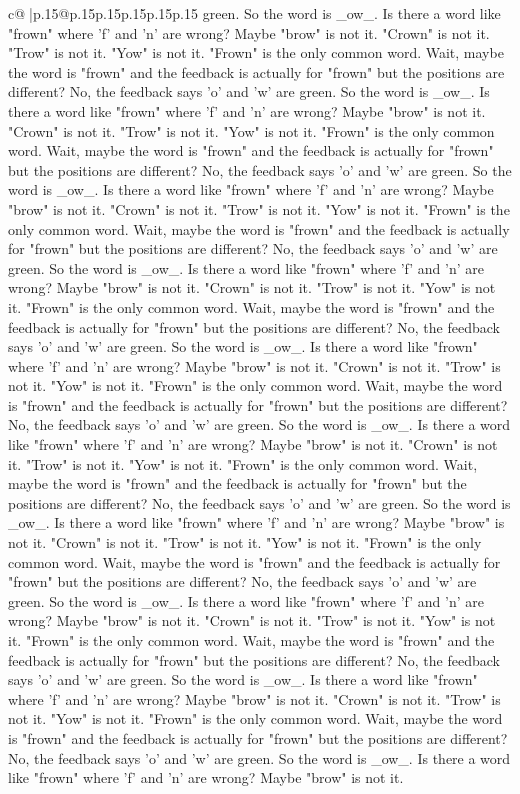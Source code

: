 \documentclass{article}
\begin{document}
{\begin{supertabular}{c@{$\;$}|p{.15\linewidth}@{}p{.15\linewidth}p{.15\linewidth}p{.15\linewidth}p{.15\linewidth}p{.15\linewidth}}
{{{green. So the word is \_ow\_. Is there a word like "frown" where 'f' and 'n' are wrong? Maybe "brow" is not it. "Crown" is not it. "Trow" is not it. "Yow" is not it. "Frown" is the only common word. Wait, maybe the word is "frown" and the feedback is actually for "frown" but the positions are different? No, the feedback says 'o' and 'w' are green. So the word is \_ow\_. Is there a word like "frown" where 'f' and 'n' are wrong? Maybe "brow" is not it. "Crown" is not it. "Trow" is not it. "Yow" is not it. "Frown" is the only common word. Wait, maybe the word is "frown" and the feedback is actually for "frown" but the positions are different? No, the feedback says 'o' and 'w' are green. So the word is \_ow\_. Is there a word like "frown" where 'f' and 'n' are wrong? Maybe "brow" is not it. "Crown" is not it. "Trow" is not it. "Yow" is not it. "Frown" is the only common word. Wait, maybe the word is "frown" and the feedback is actually for "frown" but the positions are different? No, the feedback says 'o' and 'w' are green. So the word is \_ow\_. Is there a word like "frown" where 'f' and 'n' are wrong? Maybe "brow" is not it. "Crown" is not it. "Trow" is not it. "Yow" is not it. "Frown" is the only common word. Wait, maybe the word is "frown" and the feedback is actually for "frown" but the positions are different? No, the feedback says 'o' and 'w' are green. So the word is \_ow\_. Is there a word like "frown" where 'f' and 'n' are wrong? Maybe "brow" is not it. "Crown" is not it. "Trow" is not it. "Yow" is not it. "Frown" is the only common word. Wait, maybe the word is "frown" and the feedback is actually for "frown" but the positions are different? No, the feedback says 'o' and 'w' are green. So the word is \_ow\_. Is there a word like "frown" where 'f' and 'n' are wrong? Maybe "brow" is not it. "Crown" is not it. "Trow" is not it. "Yow" is not it. "Frown" is the only common word. Wait, maybe the word is "frown" and the feedback is actually for "frown" but the positions are different? No, the feedback says 'o' and 'w' are green. So the word is \_ow\_. Is there a word like "frown" where 'f' and 'n' are wrong? Maybe "brow" is not it. "Crown" is not it. "Trow" is not it. "Yow" is not it. "Frown" is the only common word. Wait, maybe the word is "frown" and the feedback is actually for "frown" but the positions are different? No, the feedback says 'o' and 'w' are green. So the word is \_ow\_. Is there a word like "frown" where 'f' and 'n' are wrong? Maybe "brow" is not it. "Crown" is not it. "Trow" is not it. "Yow" is not it. "Frown" is the only common word. Wait, maybe the word is "frown" and the feedback is actually for "frown" but the positions are different? No, the feedback says 'o' and 'w' are green. So the word is \_ow\_. Is there a word like "frown" where 'f' and 'n' are wrong? Maybe "brow" is not it. "Crown" is not it. "Trow" is not it. "Yow" is not it. "Frown" is the only common word. Wait, maybe the word is "frown" and the feedback is actually for "frown" but the positions are different? No, the feedback says 'o' and 'w' are green. So the word is \_ow\_. Is there a word like "frown" where 'f' and 'n' are wrong? Maybe "brow" is not it. }}}
\end{supertabular}}
\end{document}
